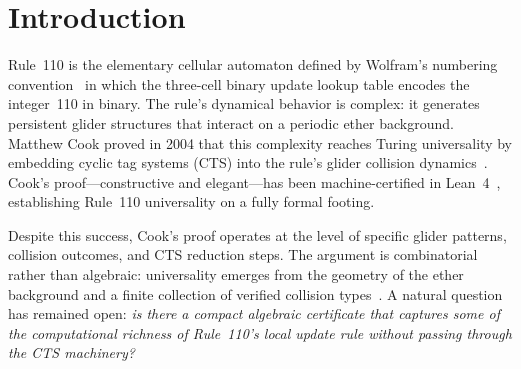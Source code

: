 \documentclass[11pt]{article}
\theoremstyle{remark}
\begin{document}
\begin{abstract}
the GTE dynamical substrate~\cite{SpivackGTEUnification}, where this identity
underlies the finite Boolean functional completeness of the physical field's kink
arithmetic; $\Phi_{\mathrm{MDL}}$'s Turing universality is established separately
via a Cook-route composition (\S\ref{sec:gte}).
The prime $7 = N_c^2 - N_c + 1$ is the unique Frobenius prime generated by the QCD colour rank $N_c = 3$, machine-certified as \texttt{frobenius\_chain\_level1} (\texttt{UgpLean.Universality.FrobeniusChain}, zero \texttt{sorry}); the lepton seed $b_{L_1} = 73 = N_c^4 - N_c^2 + 1$ is the level-2 Frobenius prime, connecting $\mathrm{GF}(7)$ to the full GTE lepton mass hierarchy via the Frobenius-Generation Coincidence Identity (FGCI; \texttt{fgci\_unique\_at\_nc}, zero \texttt{sorry}).
\end{abstract}

{\small\tableofcontents}

\section{Introduction}
\label{sec:intro}

Rule~110 is the elementary cellular automaton defined by Wolfram's numbering
convention~\cite{Wolfram2002} in which the three-cell binary update lookup table
encodes the integer~110 in binary.
The rule's dynamical behavior is complex: it generates persistent glider structures
that interact on a periodic ether background.
Matthew Cook proved in 2004 that this complexity reaches Turing universality by
embedding cyclic tag systems (CTS) into the rule's glider
collision dynamics~\cite{Cook2004,Cook2009}.
Cook's proof---constructive and elegant---has been machine-certified in
Lean~4~\cite{SpivackCookTheorem,rule110-lean}, establishing Rule~110 universality
on a fully formal footing.

Despite this success, Cook's proof operates at the level of specific glider patterns,
collision outcomes, and CTS reduction steps.
The argument is combinatorial rather than algebraic: universality emerges from
the geometry of the ether background and a finite collection of verified collision
types~\cite{Cook2009,NearyW06}.
A natural question has remained open: \emph{is there a compact algebraic certificate
that captures some of the computational richness of Rule~110's local update rule
without passing through the CTS machinery?}
\end{document}
